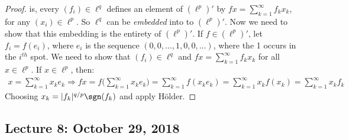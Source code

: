 \documentclass[crop=false,class=book,oneside]{standalone}
\begin{document}
\begin{proof}
                is, every $(f_{i})\in\ell^{q}$ defines an element
                of $(\ell^{p})'$ by
                $fx=\sum_{k=1}^{\infty}f_{k}x_{k}$, for any
                $(x_{i})\in\ell^{p}$. So $\ell^{q}$ can
                be \textit{embedded} into to $(\ell^{p})'$.
                Now we need to show that this embedding is
                the entirety of $(\ell^{p})'$. If
                $f\in(\ell^{p})'$, let
                $f_{i}=f(e_{i})$, where $e_{i}$ is the
                sequence $(0,0,\hdots,1,0,0,\hdots)$, where
                the 1 occurs in the $i^{th}$ spot. We need
                to show that $(f_{i})\in\ell^{q}$ and
                $fx=\sum_{k=1}^{\infty}f_{k}x_{k}$
                for all $x\in\ell^{p}$. If $x\in\ell^{p}$, then:
                \begin{align*}
                    x=\sum_{k=1}^{\infty}x_{k}e_{k}
                    \Rightarrow
                    fx=f\Big(\sum_{k=1}^{\infty}x_{k}e_{k}\Big)
                    =\sum_{k=1}^{\infty}f(x_{k}e_{k})
                    =\sum_{k=1}^{\infty}x_{k}f(x_{k})
                    =\sum_{k=1}^{\infty}x_{k}f_{k}
                \end{align*}
                Choosing $x_{k}=|f_{k}|^{q/p}\sgn(f_{k})$ and apply
                H\"{o}lder.
            \end{proof}
    \subsection{Lecture 8: October 29, 2018}
\end{document}
